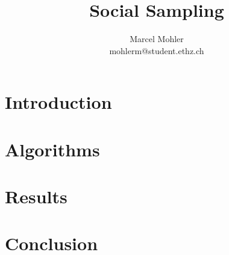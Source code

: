 \documentclass[a4paper,11pt]{article}
\title{\textbf{Social Sampling}}
\author{Marcel Mohler\\
		mohlerm@student.ethz.ch}
\begin{document}
\maketitle

\begin{abstract}

\end{abstract}
\section{Introduction}


\section{Algorithms}


\section{Results}


\section{Conclusion}




\end{document}
